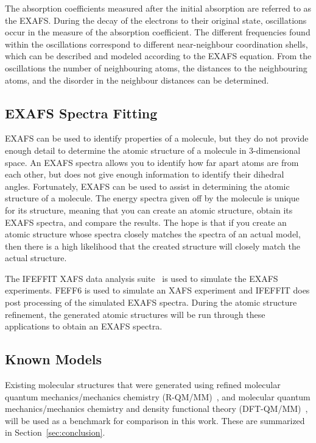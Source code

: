 \documentclass[conference]{IEEEtran}
\begin{document}
The absorption coefficients measured after the initial absorption are referred to as the EXAFS. During the decay of the electrons to their original state, oscillations occur in the measure of the absorption coefficient. The different frequencies found within the oscillations correspond to different near-neighbour coordination shells, which can be described and modeled according to the EXAFS equation. From the oscillations the number of neighbouring atoms, the distances to the neighbouring atoms, and the disorder in the neighbour distances can be determined.

\subsection{EXAFS Spectra Fitting}

EXAFS can be used to identify properties of a molecule, but they do not provide enough detail to determine the atomic structure of a molecule in 3-dimensional space. An EXAFS spectra allows you to identify how far apart atoms are from each other, but does not give enough information to identify their dihedral angles. Fortunately, EXAFS can be used to assist in determining the atomic structure of a molecule. The energy spectra given off by the molecule is unique for its structure, meaning that you can create an atomic structure, obtain its EXAFS spectra, and compare the results. The hope is that if you create an atomic structure whose spectra closely matches the spectra of an actual model, then there is a high likelihood that the created structure will closely match the actual structure.

The IFEFFIT XAFS data analysis suite~\cite{ifeffit} is used to simulate the EXAFS experiments. FEFF6 is used to simulate an XAFS experiment and IFEFFIT does post processing of the simulated EXAFS spectra. During the atomic structure refinement, the generated atomic structures will be run through these applications to obtain an EXAFS spectra.

\subsection{Known Models}

Existing molecular structures that were generated using refined molecular quantum mechanics/mechanics chemistry (R-QM/MM)~\cite{luber2011s1}, and molecular quantum mechanics/mechanics chemistry and density functional theory (DFT-QM/MM)~\cite{luber2011s1}, will be used as a benchmark for comparison in this work. These are summarized in Section~\ref{sec:conclusion}.
\end{document}
